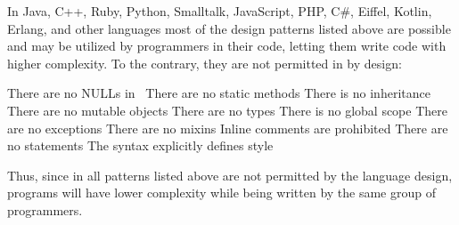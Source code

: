 In Java, C++, Ruby, Python, Smalltalk, JavaScript,
PHP, C\#, Eiffel, Kotlin, Erlang, and other languages most
of the design patterns listed above are possible and may be
utilized by programmers in their code, letting them write
code with higher complexity. To the contrary, they
are not permitted in \eolang{} by design:

\begin{itemize}
 There are no NULLs in~\eolang{}
 There are no static methods
 There is no inheritance
 There are no mutable objects
 There are no types
 There is no global scope
 There are no exceptions
 There are no mixins
 Inline comments are prohibited
 There are no statements
 The syntax explicitly defines style
\end{itemize}

Thus, since in \eolang{} all patterns listed above
are not permitted by the language design, \eolang{} programs
will have lower complexity while being written by the same group
of programmers.
